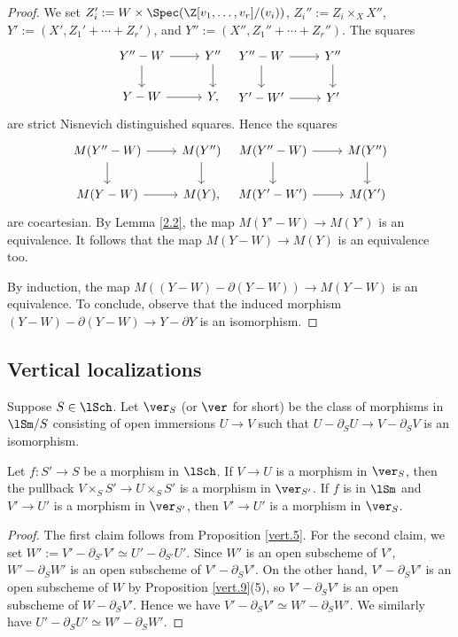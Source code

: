 \documentclass[10pt]{amsart}
\begin{document}
\begin{proof}
We set $Z_i':=W\times \Spec(\Z[v_1,\ldots,v_r]/(v_i))$, $Z_i'':=Z_i\times_X X''$, $Y':=(X',Z_1'+\cdots+Z_r')$, and $Y'':=(X'',Z_1''+\cdots+Z_r'')$.
The squares
\[
\begin{tikzcd}
Y''-W\ar[r]\ar[d]&
Y''\ar[d]
\\
Y-W\ar[r]&
Y,
\end{tikzcd}
\;\;
\begin{tikzcd}
Y''-W\ar[r]\ar[d]&
Y''\ar[d]
\\
Y'-W'\ar[r]&
Y'
\end{tikzcd}
\]
are strict Nisnevich distinguished squares.
Hence the squares
\[
\begin{tikzcd}
M(Y''-W)\ar[r]\ar[d]&
M(Y'')\ar[d]
\\
M(Y-W)\ar[r]&
M(Y),
\end{tikzcd}
\;\;
\begin{tikzcd}
M(Y''-W)\ar[r]\ar[d]&
M(Y'')\ar[d]
\\
M(Y'-W')\ar[r]&
M(Y')
\end{tikzcd}
\]
are cocartesian.
By Lemma \ref{2.2}, the map $M(Y'-W)\to M(Y')$ is an equivalence.
It follows that the map $M(Y-W)\to M(Y)$ is an equivalence too.

By induction, the map $M((Y-W)-\partial (Y-W))\to M(Y-W)$ is an equivalence.
To conclude, observe that the induced morphism $(Y-W)-\partial (Y-W)\to Y-\partial Y$ is an isomorphism.
\end{proof}




\subsection{Vertical localizations}
\label{vertical_localizations}

\begin{df}
Suppose $S\in \lSch$.
Let $\ver_S$ (or $\ver$ for short) be the class of morphisms in $\lSm/S$ consisting of open immersions $U\to V$ such that $U-\partial_S U\to V-\partial_S V$ is an isomorphism.
\end{df}

\begin{prop}
\label{comp.4}
Let $f\colon S'\to S$ be a morphism in $\lSch$.
If $V\to U$ is a morphism in $\ver_S$, then the pullback $V\times_S S'\to U\times_S S'$ is a morphism in $\ver_{S'}$.
If $f$ is in $\lSm$ and $V'\to U'$ is a morphism in $\ver_{S'}$, then $V'\to U'$ is a morphism in $\ver_S$.
\end{prop}
\begin{proof}
The first claim follows from Proposition \ref{vert.5}.
For the second claim, we set $W':=V'-\partial_{S'}V'\simeq U'-\partial_{S'}U'$.
Since $W'$ is an open subscheme of $V'$, $W'-\partial_S W'$ is an open subscheme of $V'-\partial_S V'$.
On the other hand, $V'-\partial_S V'$ is an open subscheme of $W$ by Proposition \ref{vert.9}(5), so $V'-\partial_S V'$ is an open subscheme of $W-\partial_S V'$.
Hence we have $V'-\partial_S V'\simeq W'-\partial_S W'$.
We similarly have $U'-\partial_S U'\simeq W'-\partial_S W'$.
\end{proof}
\end{document}
